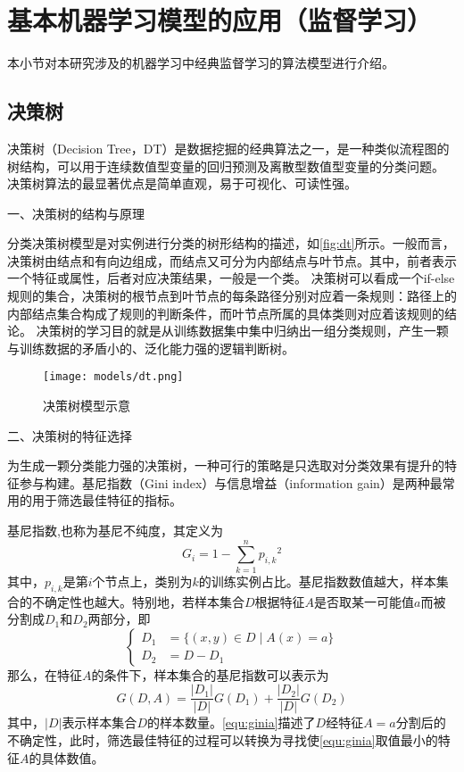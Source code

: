 \section{基本机器学习模型的应用（监督学习）}
本小节对本研究涉及的机器学习中经典监督学习的算法模型进行介绍。

\subsection{决策树}
决策树（Decision Tree，DT）是数据挖掘的经典算法之一，是一种类似流程图的树结构，可以用于连续数值型变量的回归预测及离散型数值型变量的分类问题\cite{Li2017,Liu2018}。
决策树算法的最显著优点是简单直观，易于可视化、可读性强。

一、决策树的结构与原理

分类决策树模型是对实例进行分类的树形结构的描述，如\autoref{fig:dt}所示。一般而言，决策树由结点和有向边组成，而结点又可分为内部结点与叶节点。其中，前者表示一个特征或属性，后者对应决策结果，一般是一个类\cite{Li2017,Zhou2016}。
决策树可以看成一个if-else规则的集合，决策树的根节点到叶节点的每条路径分别对应着一条规则：路径上的内部结点集合构成了规则的判断条件，而叶节点所属的具体类则对应着该规则的结论。
决策树的学习目的就是从训练数据集中集中归纳出一组分类规则，产生一颗与训练数据的矛盾小的、泛化能力强的逻辑判断树。
\begin{figure}[htbp]
    \centering
    \texttt{[image: models/dt.png]}
    \caption{\label{fig:dt}决策树模型示意}
\end{figure}

二、决策树的特征选择

为生成一颗分类能力强的决策树，一种可行的策略是只选取对分类效果有提升的特征参与构建。基尼指数（Gini index）与信息增益（information gain）是两种最常用的用于筛选最佳特征的指标。

基尼指数,也称为基尼不纯度，其定义为
\begin{equation}
    \label{equ:gini}
    G_i = 1 - \sum_{k=1}^n{p_{i,k}}^2
\end{equation}
其中，$p_{i,k}$是第$i$个节点上，类别为$k$的训练实例占比。基尼指数数值越大，样本集合的不确定性也越大。特别地，若样本集合$D$根据特征$A$是否取某一可能值$a$而被分割成$D_1$和$D_2$两部分，即
\begin{equation}
    \label{equ:daset}
    \left \{
    \begin{aligned}
        D_1 &= \{ (x,y) \in D \mid A(x) = a\} \\
        D_2 &= D - D_1
    \end{aligned}
    \right.
\end{equation}
那么，在特征$A$的条件下，样本集合的基尼指数可以表示为
\begin{equation}
    \label{equ:ginia}
    G(D,A) = \frac{|D_1|}{|D|}G(D_1) + \frac{|D_2|}{|D|}G(D_2)
\end{equation}
其中，$|D|$表示样本集合$D$的样本数量。\autoref{equ:ginia}描述了$D$经特征$A=a$分割后的不确定性，此时，筛选最佳特征的过程可以转换为寻找使\autoref{equ:ginia}取值最小的特征$A$的具体数值。

